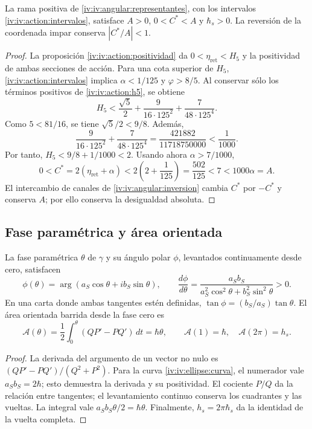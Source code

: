 \begin{proposition}
\label{iv:iv:ellipse:pertenencia}
La rama positiva de \eqref{iv:iv:angular:representantes}, con los
intervalos \eqref{iv:iv:action:intervalos}, satisface
\(A>0\), \(0<C^*<A\) y \(\hbar_s>0\).
La reversión de la coordenada impar conserva \(|C^*/A|<1\).
\end{proposition}
\begin{proof}
La proposición \ref{iv:iv:action:positividad} da
\(0<\eta_{\mathrm{ret}}<H_5\) y la positividad de ambas
secciones de acción. Para una cota superior de \(H_5\),
\eqref{iv:iv:action:intervalos} implica
\(\alpha<1/125\) y \(\varphi>8/5\). Al conservar sólo
los términos positivos de \eqref{iv:iv:action:h5}, se obtiene
\[
 H_5<
 \frac{\sqrt5}{2}+
 \frac{9}{16\cdot125^2}+
 \frac{7}{48\cdot125^4}.
\]
Como \(5<81/16\), se tiene \(\sqrt5/2<9/8\). Además,
\[
 \frac{9}{16\cdot125^2}+
 \frac{7}{48\cdot125^4}
 =\frac{421882}{11718750000}<\frac1{1000}.
\]
Por tanto, \(H_5<9/8+1/1000<2\). Usando ahora
\(\alpha>7/1000\),
\[
 0<C^*=2(\eta_{\mathrm{ret}}+\alpha)
 <2\left(2+\frac1{125}\right)=\frac{502}{125}
 <7<1000\alpha=A.
\]
El intercambio de canales de
\ref{iv:iv:angular:inversion} cambia \(C^*\) por \(-C^*\)
y conserva \(A\); por ello conserva la desigualdad absoluta.
\end{proof}

\subsection{Fase paramétrica y área orientada}
\label{iv:iv:ellipse:area}

\begin{proposition}
\label{iv:iv:ellipse:ley-areal}
La fase paramétrica \(\theta\) de \(\gamma\) y su ángulo
polar \(\phi\), levantados continuamente desde cero, satisfacen
\begin{equation}
 \phi(\theta)=\arg(a_S\cos\theta+i b_S\sin\theta),\qquad
 \frac{d\phi}{d\theta}
 =\frac{a_Sb_S}{a_S^2\cos^2\theta+b_S^2\sin^2\theta}>0.
 \label{iv:iv:ellipse:fases}
\end{equation}
En una carta donde ambas tangentes estén definidas,
\(\tan\phi=(b_S/a_S)\tan\theta\). El área orientada barrida
desde la fase cero es
\begin{equation}
 \mathcal A(\theta)=
 \frac12\int_0^\theta(QP'-PQ')\,dt=\hbar\theta,
 \qquad
 \mathcal A(1)=\hbar,\quad\mathcal A(2\pi)=h_s.
 \label{iv:iv:ellipse:area-fase}
\end{equation}
\end{proposition}
\begin{proof}
La derivada del argumento de un vector no nulo es
\((QP'-PQ')/(Q^2+P^2)\). Para la curva
\eqref{iv:iv:ellipse:curva}, el numerador vale
\(a_Sb_S=2\hbar\); esto demuestra la derivada y su
positividad. El cociente \(P/Q\) da la relación entre tangentes;
el levantamiento continuo conserva los cuadrantes y las vueltas.
La integral vale \(a_Sb_S\theta/2=\hbar\theta\).
Finalmente, \(h_s=2\pi\hbar_s\) da la identidad de la
vuelta completa.
\end{proof}

